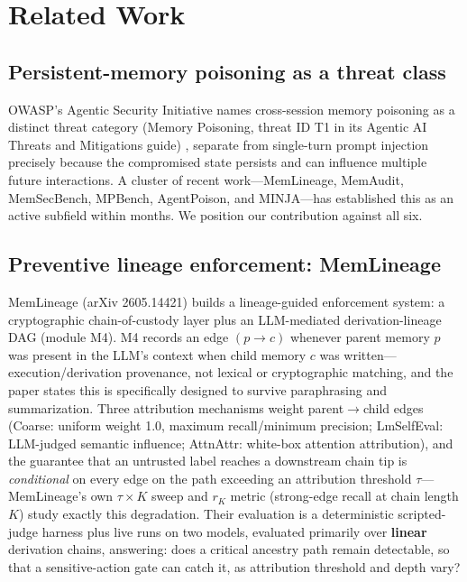 \section{Related Work}

\subsection{Persistent-memory poisoning as a threat class}

OWASP's Agentic Security Initiative names cross-session memory
poisoning as a distinct threat category (Memory Poisoning, threat ID
T1 in its Agentic AI Threats and Mitigations guide) \cite{owasp-asi},
separate from single-turn prompt injection precisely because the
compromised state persists and can influence multiple future
interactions. A cluster of recent work---MemLineage, MemAudit,
MemSecBench, MPBench, AgentPoison, and MINJA---has established this as
an active subfield within months. We position our contribution against
all six.

\subsection{Preventive lineage enforcement: MemLineage}

MemLineage (arXiv 2605.14421) \cite{memlineage} builds a
lineage-guided enforcement system: a cryptographic chain-of-custody
layer plus an LLM-mediated derivation-lineage DAG (module M4). M4
records an edge $(p \to c)$ whenever parent memory $p$ was present in
the LLM's context when child memory $c$ was written---execution/derivation
provenance, not lexical or cryptographic matching, and the paper states
this is specifically designed to survive paraphrasing and
summarization. Three attribution mechanisms weight parent$\to$child
edges (Coarse: uniform weight 1.0, maximum recall/minimum precision;
LmSelfEval: LLM-judged semantic influence; AttnAttr: white-box
attention attribution), and the guarantee that an untrusted label
reaches a downstream chain tip is \emph{conditional} on every edge on
the path exceeding an attribution threshold $\tau$---MemLineage's own
$\tau \times K$ sweep and $r_K$ metric (strong-edge recall at chain
length $K$) study exactly this degradation. Their evaluation is a
deterministic scripted-judge harness plus live runs on two models,
evaluated primarily over \textbf{linear} derivation chains, answering:
does a critical ancestry path remain detectable, so that a
sensitive-action gate can catch it, as attribution threshold and depth
vary?

